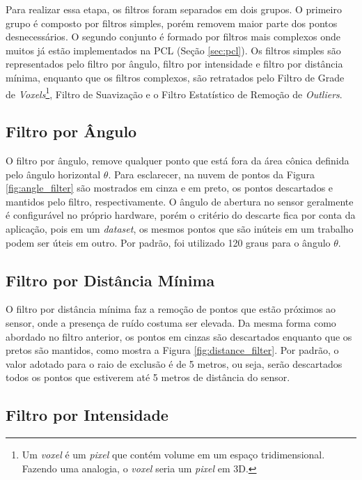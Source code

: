 Para realizar essa etapa, os filtros foram separados em dois grupos.
O primeiro grupo é composto por filtros simples, porém removem maior parte dos pontos desnecessários. 
O segundo conjunto é formado por filtros mais complexos onde muitos já estão implementados na PCL (Seção \ref{sec:pcl}).
Os filtros simples são representados pelo filtro por ângulo, filtro por intensidade e filtro por distância mínima, enquanto que os filtros complexos, são retratados pelo Filtro de Grade de \textit{Voxels}\footnote{Um \textit{voxel} é um \textit{pixel} que contém volume em um espaço tridimensional. Fazendo uma analogia, o \textit{voxel} seria um \textit{pixel} em 3D.}, Filtro de Suavização e o Filtro Estatístico de Remoção de \textit{Outliers}.


\subsection{Filtro por Ângulo}
\label{sec:angle_filter}

O filtro por ângulo, remove qualquer ponto que está fora da área cônica definida pelo ângulo horizontal $\theta$. Para esclarecer, na nuvem de pontos da Figura \ref{fig:angle_filter} são mostrados em cinza e em preto, os pontos descartados e mantidos pelo filtro, respectivamente.
O ângulo de abertura no sensor geralmente é configurável no próprio hardware, porém o critério do descarte fica por conta da aplicação, pois em um \textit{dataset}, os mesmos pontos que são inúteis em um trabalho podem ser úteis em outro. 
Por padrão, foi utilizado 120 graus para o ângulo $\theta$.

\subsection{Filtro por Distância Mínima}
\label{sec:distance_filter}

O filtro por distância mínima faz a remoção de pontos que estão próximos ao sensor, onde a presença de ruído costuma ser elevada. Da mesma forma como abordado no filtro anterior, os pontos em cinzas são descartados enquanto que os pretos são mantidos, como mostra a Figura \ref{fig:distance_filter}. Por padrão, o valor adotado para o raio de exclusão é de 5 metros, ou seja, serão descartados todos os pontos que estiverem até 5 metros de distância do sensor.

\subsection{Filtro por Intensidade}
\label{sec:intensity_filter}

